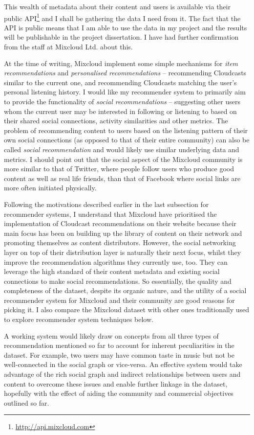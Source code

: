 This wealth of metadata about their content and users is available via their public API\footnote{\url{http://api.mixcloud.com}} and I shall be gathering the data I need from it. The fact that the API is public means that I am able to use the data in my project and the results will be publishable in the project dissertation. I have had further confirmation from the staff at Mixcloud Ltd. about this.

At the time of writing, Mixcloud implement some simple mechanisms for \emph{item recommendations} and \emph{personalised recommendations} -- recommending Cloudcasts similar to the current one, and recommending Cloudcasts matching the user's personal listening history. I would like my recommender system to primarily aim to provide the functionality of \emph{social recommendations} -- suggesting other users whom the current user may be interested in following or listening to based on their shared social connections, activity similarities and other metrics. The problem of recommending content to users based on the listening pattern of their own social connections (as opposed to that of their entire community) can also be called \emph{social recommendation} and would likely use similar underlying data and metrics. I should point out that the social aspect of the Mixcloud community is more similar to that of Twitter, where people follow users who produce good content as well as real life friends, than that of Facebook where social links are more often initiated physically.

Following the motivations described earlier in the last subsection for recommender systems, I understand that Mixcloud have prioritised the implementation of Cloudcast recommendations on their website because their main focus has been on building up the library of content on their network and promoting themselves as content distributors. However, the social networking layer on top of their distribution layer is naturally their next focus, whilst they improve the recommendation algorithms they currently use, too. They can leverage the high standard of their content metadata and existing social connections to make social recommendations. So essentially, the quality and completeness of the dataset, despite its organic nature, and the utility of a social recommender system for Mixcloud and their community are good reasons for picking it. I also compare the Mixcloud dataset with other ones traditionally used to explore recommender system techniques below.

A working system would likely draw on concepts from all three types of recommendation mentioned so far to account for inherent peculiarities in the dataset. For example, two users may have common taste in music but not be well-connected in the social graph or vice-versa. An effective system would take advantage of the rich social graph and indirect relationships between users and content to overcome these issues and enable further linkage in the dataset, hopefully with the effect of aiding the community and commercial objectives outlined so far.

